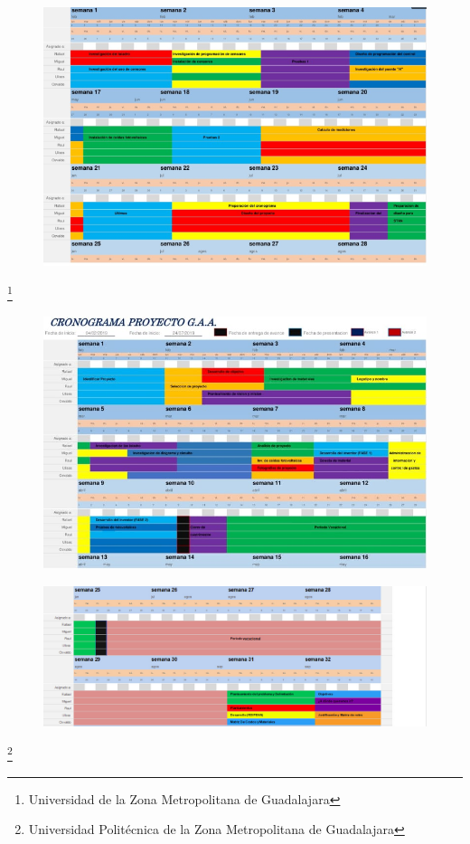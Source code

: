 \documentclass[11pt,a4paper]{article}
\begin{document}
 \begin{figure}[hbtp]
 \centering
  \includegraphics[scale=0.90]{Pictures/Digrama(02).png} 
 \end{figure}
\footnote{Universidad de la Zona Metropolitana de Guadalajara}

\newpage
\begin{figure}[hbtp]
\centering
\includegraphics[scale=0.65]{Pictures/Diagrama.jpg}
\end{figure}

\begin{figure}[hbtp]
\centering
\includegraphics[scale=0.5]{Pictures/diagrama1.jpeg}
\end{figure}
\footnote{Universidad Politécnica de la Zona Metropolitana de Guadalajara}
\end{document}
